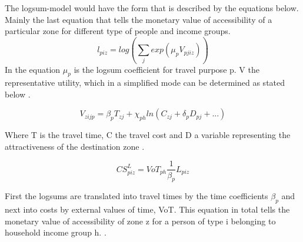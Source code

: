 The logsum-model would have the form that is described by the equations below. Mainly the last equation that tells the monetary value of accessibility of a particular zone for different type of people and income groups\citep{geurs}.\\

\begin{equation}
l_{piz} = log(\sum_j exp(\mu_p V_{pjiz}))
\end{equation}
In the equation $\mu_p$ is the logsum coefficient for travel purpose p. 
V the representative utility, which in a simplified mode can be determined as stated below \citep{geurs}.

\begin{equation}
V_{zijp} = \beta_p T_{zj} + \chi_{ph} ln(C_{zj} + \delta_p D_{pj} + ...)
\end{equation}

Where T is the travel time, C the travel cost and D a variable representing the attractiveness of the destination zone \citep{geurs}.

\begin{equation}
CS_{piz}^L = VoT_{ph}  \frac{1}{\beta_p}  L_{piz}
\end{equation}

First the logsums are translated into travel times by the time coefficients $\beta_p$ and next into costs by external values of time, VoT. This equation in total tells the monetary value of accessibility of zone z for a person of type i belonging to household income group h. \citep{geurs}.
